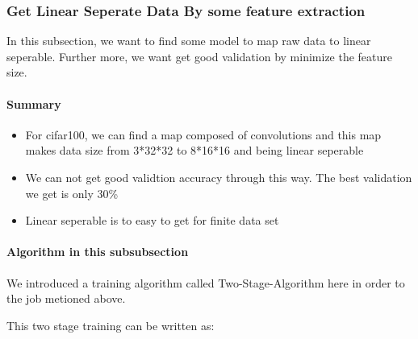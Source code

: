 \subsubsection{Get Linear Seperate Data By some feature extraction}
In this subsection, we want to find some model to map raw data to linear seperable. Further more, we want get good validation by minimize the feature size.

\paragraph{Summary}
\begin{itemize}
	\item For cifar100, we can find a map composed of convolutions and this map makes data size from 3*32*32 to 8*16*16 and being linear seperable
	\item We can not get good validtion accuracy through this way. The best validation we get is only 30\%
	\item Linear seperable is to easy to get for finite data set
\end{itemize}

\paragraph{Algorithm in this subsubsection}
We introduced a training algorithm called Two-Stage-Algorithm here in order to the job metioned above.



This two stage training can be written as:

